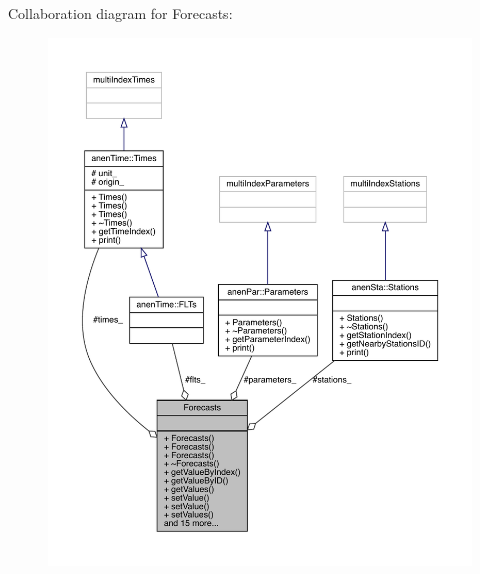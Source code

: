 Collaboration diagram for Forecasts\+:
\nopagebreak
\begin{figure}[H]
\begin{center}
\leavevmode
\includegraphics[width=350pt]{class_forecasts__coll__graph}
\end{center}
\end{figure}
